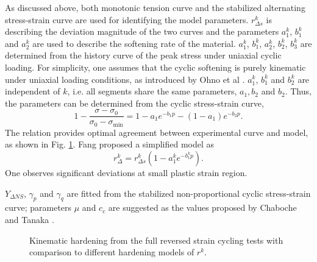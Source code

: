 \documentclass[preprint,5p,twocolumn,11pt,sort&compress]{elsarticle}
\begin{document}
As discussed above, both monotonic tension curve and the stabilized alternating stress-strain curve are used for identifying the model parameters.
$r_{\Delta s}^k$ is describing the deviation magnitude of the two curves and the parameters $a_{1}^k$, $b_{1}^k$ and $a_{2}^k$ are used to describe the softening rate of the material.
$a_1^k$, $b_1^k$, $a_2^k$, $b_2^k$, $b_3^k$ are determined from the history curve of the peak stress under uniaxial cyclic loading. For simplicity, one assumes that the cyclic softening is purely kinematic under uniaxial loading conditions, as introduced by Ohno et al \cite{Ohno1993375}.
$a_{1}^k$, $b_{1}^k$ and $b_{2}^k$ are independent of $k$, i.e. all segments share the same parameters, $a_1, b_2$ and $b_2$.
Thus, the parameters can be determined from the cyclic stress-strain curve,
\begin{equation}
1 - \frac{{\sigma  - {\sigma _0}}}{{{\sigma _0} - {\sigma _{\min }}}} = 1 - a_1{e^{ - b_1 p}} - \left( {1 - a_1} \right){e^{ - b_2 p}}.
\end{equation}
The relation provides optimal agreement between experimental curve and model, as shown in Fig.  \ref{Fig:Fitting300C_7041_Plot}. Fang \cite{fang2015cyclic} proposed a simplified model as
\begin{equation}
r_\Delta ^k = r_{\Delta s}^k\left( 1 - a_1^k{e^{ - b_1^kp}}\right).
\label{Equ:fangrdeltak}
\end{equation}
One observes significant deviations at small plastic strain region.

$Y_{\Delta NS}$, $\gamma_p$ and $\gamma_q$ are fitted from the stabilized non-proportional cyclic stress-strain curve;
parameters $\mu$ and $c_c$ are suggested as the values proposed by Chaboche \cite{Chaboche1986149} and Tanaka \cite{tanaka1994nonproportionality}.


\begin{figure}[!htp]
\caption{Kinematic hardening from the full reversed strain cycling tests with comparison to different hardening models of $r^k$.}
\label{Fig:Fitting300C_7041_Plot}
\end{figure}
\end{document}
